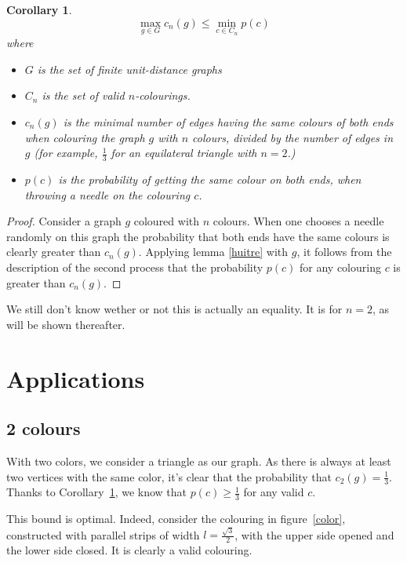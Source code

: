 \documentclass[a4paper,11pt]{article}
\newtheorem{cons}{Corollary}
\theoremstyle{definition}
\theoremstyle{remark}
\begin{document}
\begin{cons} \label{ineg}
$$ \max_{g \in G} c_n(g) \leq \min_{c \in C_n} p(c) $$
where \begin{itemize} 
  \item $G$ is the set of finite unit-distance graphs 
  \item $C_n$ is the set of valid $n$-colourings.
  \item $c_n(g)$ is the minimal number of edges having the same colours of both 
ends when colouring the graph $g$ with $n$ colours, divided by the 
number of edges in $g$
(for example, $\frac 1 {3}$ for an equilateral triangle with $n=2$.)
  \item $p(c)$ is the probability of getting the same colour on both ends, when 
throwing a needle on the colouring $c$.
\end{itemize}

\end{cons}

\begin{proof}
Consider a graph $g$ coloured with $n$ colours. When one chooses a needle
randomly on this graph the probability that both ends have the same
colours is clearly greater than $c_n(g)$. Applying lemma \ref{huitre} with $g$, 
it follows from the description of the second process that the probability 
$p(c)$ for any colouring $c$ is greater than $c_n(g)$.
\end{proof}
We still don't know wether or not this is actually an equality. It is for 
$n=2$, as will be shown thereafter.

\section{Applications} \label{appli}
\subsection{2 colours}


With two colors, we consider a triangle as our graph. 
As there is always at least two vertices with the same color, it's clear that 
the probability that $c_2(g) = \frac{1}{3}$. Thanks to Corollary~\ref{ineg}, 
we know that $p(c) \geq \frac13$ for any valid $c$.

This bound is optimal. Indeed, consider the colouring in figure~\ref{color}, 
constructed with parallel strips of width 
$l = \frac {\sqrt3}{2}$, with the upper side opened and the lower side closed. 
It is clearly a valid colouring.
\end{document}
